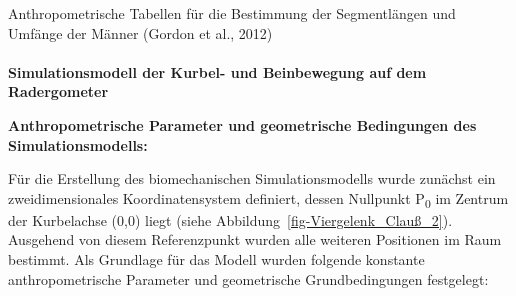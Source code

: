 \documentclass[
  letterpaper,
  DIV=11]{scrartcl}
\makeatletter
\let\oldparagraph\paragraph
\renewcommand{\paragraph}{
    \@ifstar
      \xxxParagraphStar
      \xxxParagraphNoStar
  }
\newcommand{\xxxParagraphStar}[1]{\oldparagraph*{#1}\mbox{}}
\newcommand{\xxxParagraphNoStar}[1]{\oldparagraph{#1}\mbox{}}
\makeatother
\begin{document}
\begin{tcolorbox}
\begin{table}[H]
\caption{\label{tbl-Anthropometrische_Tabellen_male}Anthropometrische
Tabellen für die Bestimmung der Segmentlängen und Umfänge der Männer
(Gordon et al., 2012)}


\end{table}%

\end{tcolorbox}

\paragraph{\texorpdfstring{\textbf{Simulationsmodell der Kurbel- und
Beinbewegung auf dem
Radergometer}}{Simulationsmodell der Kurbel- und Beinbewegung auf dem Radergometer}}\label{simulationsmodell-der-kurbel--und-beinbewegung-auf-dem-radergometer}

\textbf{Anthropometrische Parameter und geometrische Bedingungen des
Simulationsmodells:}

Für die Erstellung des biomechanischen Simulationsmodells wurde zunächst
ein zweidimensionales Koordinatensystem definiert, dessen Nullpunkt
P\textsubscript{0} im Zentrum der Kurbelachse (0,0) liegt (siehe
Abbildung~\ref{fig-Viergelenk_Clauß_2}). Ausgehend von diesem
Referenzpunkt wurden alle weiteren Positionen im Raum bestimmt. Als
Grundlage für das Modell wurden folgende konstante anthropometrische
Parameter und geometrische Grundbedingungen festgelegt:
\end{document}
